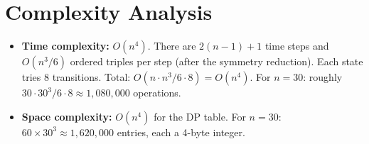 \documentclass[11pt,a4paper]{article}
\begin{document}
\section{Complexity Analysis}

\begin{itemize}
  \item \textbf{Time complexity:} $O(n^4)$.
        There are $2(n-1) + 1$ time steps and $O(n^3/6)$ ordered triples per step
        (after the symmetry reduction). Each state tries 8 transitions. Total:
        $O(n \cdot n^3 / 6 \cdot 8) = O(n^4)$.
        For $n = 30$: roughly $30 \cdot 30^3 / 6 \cdot 8 \approx 1{,}080{,}000$ operations.
  \item \textbf{Space complexity:} $O(n^4)$ for the DP table. For $n = 30$:
        $60 \times 30^3 \approx 1{,}620{,}000$ entries, each a 4-byte integer.
\end{itemize}
\end{document}
